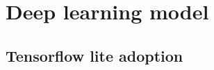 \section{Deep learning model}
\label{sec:Deep learning model}

\subsection{Tensorflow lite adoption}